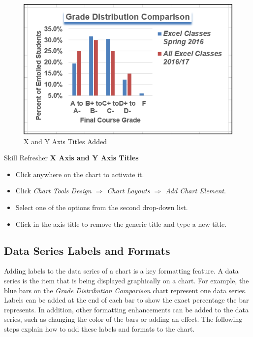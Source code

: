 \begin{figure}[H]
	\centering
	\includegraphics[width=\maxwidth{.95\linewidth}]{gfx/ch04_fig36}
	\caption{X and Y Axis Titles Added}
	\label{04:fig36}
\end{figure}

\begin{center}
	\begin{sklbox}{Skill Refresher}
		\textbf{X Axis and Y Axis Titles}
		\\
		\begin{itemize}
			\setlength{\itemsep}{0pt}
			\setlength{\parskip}{0pt}
			\setlength{\parsep}{0pt}

			\item Click anywhere on the chart to activate it.
			\item Click \textit{Chart Tools Design $ \Rightarrow $ Chart Layouts $ \Rightarrow $ Add Chart Element}.
			\item Select one of the options from the second drop-down list.
			\item Click in the axis title to remove the generic title and type a new title.
			
		\end{itemize}
	\end{sklbox}
\end{center}

\subsection{Data Series Labels and Formats}

Adding labels to the data series of a chart is a key formatting feature. A data series is the item that is being displayed graphically on a chart. For example, the blue bars on the \textit{Grade Distribution Comparison} chart represent one data series. Labels can be added at the end of each bar to show the exact percentage the bar represents. In addition, other formatting enhancements can be added to the data series, such as changing the color of the bars or adding an effect. The following steps explain how to add these labels and formats to the chart.

